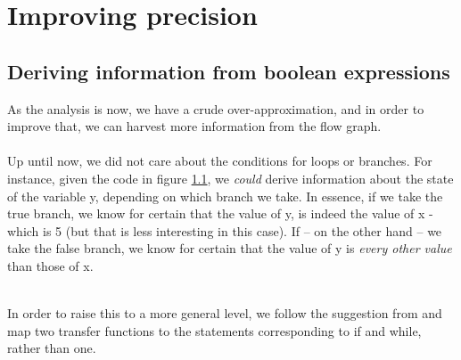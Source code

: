 \chapter{Improving precision}
\section{Deriving information from boolean expressions}
As the analysis is now, we have a crude over-approximation, and in order to improve that, we can harvest more information from the flow graph.\\\\
Up until now, we did not care about the conditions for loops or branches. For instance, given the code in figure \ref{fig:if_flow_example}, we \emph{could} derive information about the state of the variable y, depending on which branch we take. In essence, if we take the true branch, we know for certain that the value of y, is indeed the value of x - which is 5 (but that is less interesting in this case). If -- on the other hand -- we take the false branch, we know for certain that the value of y is \emph{every other value} than those of x.\\\\
\begin{figure}[h]
\centering
{}
 \caption{}
 \label{fig:if_flow_example}
\end{figure} In order to raise this to a more general level, we follow the suggestion from \cite{02242_slides} and map two transfer functions to the statements corresponding to if and while, rather than one.


